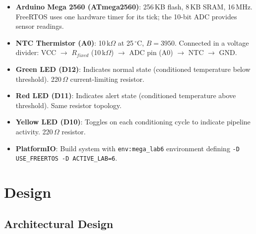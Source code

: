 \documentclass[12pt]{article}
\begin{document}
\begin{itemize}
  \item \textbf{Arduino Mega 2560 (ATmega2560)}: 256\,KB flash, 8\,KB SRAM, 16\,MHz. FreeRTOS uses one hardware timer for its tick; the 10-bit ADC provides sensor readings.
  \item \textbf{NTC Thermistor (A0)}: 10\,k$\Omega$ at 25\,$^{\circ}$C, $B = 3950$. Connected in a voltage divider: VCC $\to$ $R_{fixed}$ (10\,k$\Omega$) $\to$ ADC pin (A0) $\to$ NTC $\to$ GND.
  \item \textbf{Green LED (D12)}: Indicates normal state (conditioned temperature below threshold). 220\,$\Omega$ current-limiting resistor.
  \item \textbf{Red LED (D11)}: Indicates alert state (conditioned temperature above threshold). Same resistor topology.
  \item \textbf{Yellow LED (D10)}: Toggles on each conditioning cycle to indicate pipeline activity. 220\,$\Omega$ resistor.
  \item \textbf{PlatformIO}: Build system with \texttt{env:mega\_lab6} environment defining \texttt{-D USE\_FREERTOS -D ACTIVE\_LAB=6}. \cite{pio}
\end{itemize}

\section{Design}

\subsection{Architectural Design}
\end{document}
